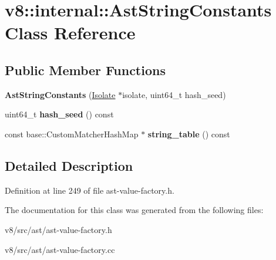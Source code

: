 \hypertarget{classv8_1_1internal_1_1AstStringConstants}{}\section{v8\+:\+:internal\+:\+:Ast\+String\+Constants Class Reference}
\label{classv8_1_1internal_1_1AstStringConstants}
\subsection*{Public Member Functions}
\begin{DoxyCompactItemize}
\item 
\mbox{\label{classv8_1_1internal_1_1AstStringConstants_af36065f11fbd4ad7a133b64a9048c728}} 
{\bfseries Ast\+String\+Constants} (\mbox{\hyperlink{classv8_1_1internal_1_1Isolate}{Isolate}} $\ast$isolate, uint64\+\_\+t hash\+\_\+seed)
\item 
\mbox{\label{classv8_1_1internal_1_1AstStringConstants_afc164715dd907b0ae5a70a2dc2d2b135}} 
uint64\+\_\+t {\bfseries hash\+\_\+seed} () const
\item 
\mbox{\label{classv8_1_1internal_1_1AstStringConstants_adf2f4f25f8eb99bc4979c52f17767640}} 
const base\+::\+Custom\+Matcher\+Hash\+Map $\ast$ {\bfseries string\+\_\+table} () const
\end{DoxyCompactItemize}


\subsection{Detailed Description}


Definition at line 249 of file ast-\/value-\/factory.\+h.



The documentation for this class was generated from the following files\+:\begin{DoxyCompactItemize}
\item 
v8/src/ast/ast-\/value-\/factory.\+h\item 
v8/src/ast/ast-\/value-\/factory.\+cc\end{DoxyCompactItemize}
